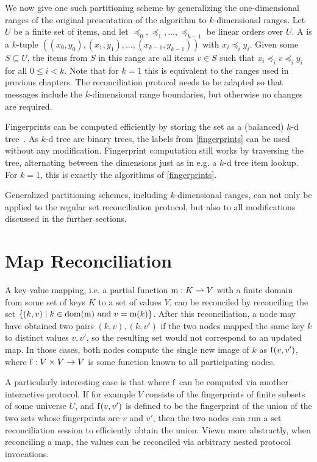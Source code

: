 We now give one such partitioning scheme by generalizing the one-dimensional ranges of the original presentation of the algorithm to $k$-dimensional ranges. Let $U$ be a finite set of items, and let $\preceq_0, \preceq_1, \ldots, \preceq_{k-1}$ be linear orders over $U$. A  is a $k$-tuple $((x_0, y_0), (x_1, y_1), \ldots, (x_{k-1}, y_{k-1}))$ with $x_i \preceq_i y_i$. Given some $S \subseteq U$, the items from $S$ in this range are all items $v \in S$ such that $x_i \preceq_i v \preceq_i y_i$ for all $0 \leq i < k$. Note that for $k = 1$ this is equivalent to the ranges used in previous chapters. The reconciliation protocol needs to be adapted so that messages include the $k$-dimensional range boundaries, but otherwise no changes are required.

Fingerprints can be computed efficiently by storing the set as a (balanced) $k$-d tree~\cite{bentley1975multidimensional}. As $k$-d tree are binary trees, the labels from \cref{fingerprints} can be used without any modification. Fingerprint computation still works by traversing the tree, alternating between the dimensions just as in e.g. a $k$-d tree item lookup. For $k = 1$, this is exactly the algorithms of \cref{fingerprints}.

Generalized partitioning schemes, including $k$-dimensional ranges, can not only be applied to the regular set reconciliation protocol, but also to all modifications discussed in the further sections.

\section{Map Reconciliation}
\label{maps}

A key-value mapping, i.e. a partial function ${\operatorname{m}}: {K} \rightharpoonup{V}$ with a finite domain from some set of keys $K$ to a set of values $V$, can be reconciled by reconciling the set $\{(k, v) \mid \text{$k \in \operatorname{dom}(\operatorname{m})$ and $v = \operatorname{m}(k)$}\}$. After this reconciliation, a node may have obtained two pairs $(k, v), (k, v')$ if the two nodes mapped the same key $k$ to distinct values $v, v'$, so the resulting set would not correspond to an updated map. In those cases, both nodes compute the single new image of $k$ as $\operatorname{f}(v, v')$, where ${\operatorname{f}}: {V \times V} \rightarrow {V}$ is some function known to all participating nodes.

A particularly interesting case is that where $\operatorname{f}$ can be computed via another interactive protocol. If for example $V$ consists of the fingerprints of finite subsets of some universe $U$, and $\operatorname{f}(v, v')$ is defined to be the fingerprint of the union of the two sets whose fingerprints are $v$ and $v'$, then the two nodes can run a set reconciliation session to efficiently obtain the union. Viewn more abstractly, when reconciling a map, the values can be reconciled via arbitrary nested protocol invocations.

